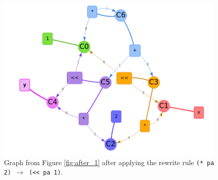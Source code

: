 \documentclass[letterpaper,twocolumn,11pt]{article}
\begin{document}
\begin{figure}
    \centering
    \includegraphics[width=1.2\columnwidth]{after-2.png}
    \caption{Graph from Figure \ref{fig:after_1} after applying the rewrite rule
      \texttt{(* pa 2) $\rightarrow$ (<< pa 1)}. }
    \label{fig:after_2}
\end{figure}
\end{document}
